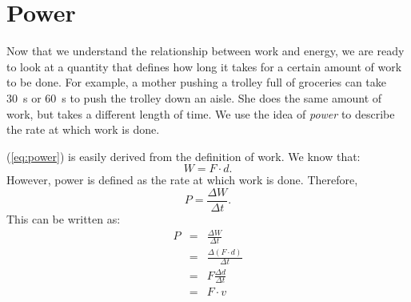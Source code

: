 \section{Power}

Now that we understand the relationship between work and energy, we are ready to look at a quantity that defines how long it takes for a certain amount of work to be done. For example, a mother pushing a trolley full of groceries can take 30~s or 60~s to push the trolley down an aisle. She does the same amount of work, but takes a different length of time. We use the idea of \textit{power} to describe the rate at which work is done.


(\ref{eq:power}) is easily derived from the definition of work. We know that:
\begin{equation*}
W=F\cdot d.
\end{equation*}
However, power is defined as the rate at which work is done. Therefore,
\begin{equation*}
P=\frac{\Delta W}{\Delta t}.
\end{equation*}
This can be written as:
\begin{eqnarray*}
P&=&\frac{\Delta W}{\Delta t}\\
&=&\frac{\Delta(F\cdot d)}{\Delta t}\\
&=&F\frac{\Delta d}{\Delta t}\\
&=&F\cdot v
\end{eqnarray*}

